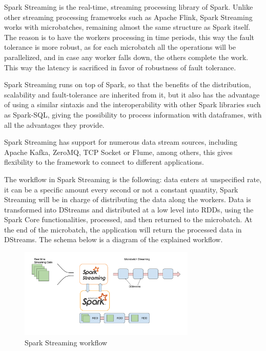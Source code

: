 \documentclass[11pt]{book} %
\begin{document}
          Spark Streaming is the real-time, streaming processing library of Spark. Unlike other streaming processing frameworks such as Apache Flink, Spark Streaming works with microbatches, remaining almost the same structure as Spark itself. The reason is to have the workers processing in time periods, this way the fault tolerance is more robust, as for each microbatch all the operations will be parallelized, and in case any worker falls down, the others complete the work. This way the latency is sacrificed in favor of robustness of fault tolerance.

          Spark Streaming runs on top of Spark, so that the benefits of the distribution, scalability and fault-tolerance are inherited from it, but it also has the advantage of using a similar sintaxis and the interoperability with other Spark libraries such as Spark-SQL, giving the possibility to process information with dataframes, with all the advantages they provide.

          Spark Streaming has support for numerous data stream sources, including Apache Kafka, ZeroMQ, TCP Socket or Flume, among others, this gives flexibility to the framework to connect to different applications.

          The workflow in Spark Streaming is the following: data enters at unspecified rate, it can be a specific amount every second or not a constant quantity, Spark Streaming will be in charge of distributing the data along the workers. Data is transformed into DStreams and distributed at a low level into RDDs, using the Spark Core functionalities, processed, and then returned to the microbatch. At the end of the microbatch, the application will return the processed data in DStreams. The schema below is a diagram of the explained workflow.

          \begin{figure}[!ht]
            \centering
            \includegraphics[width=0.75\textwidth]{Spark_Streaming_architecture.png}
            \caption{Spark Streaming workflow}
            \label{img:spark_streaming_workflow}
          \end{figure}
\end{document}
